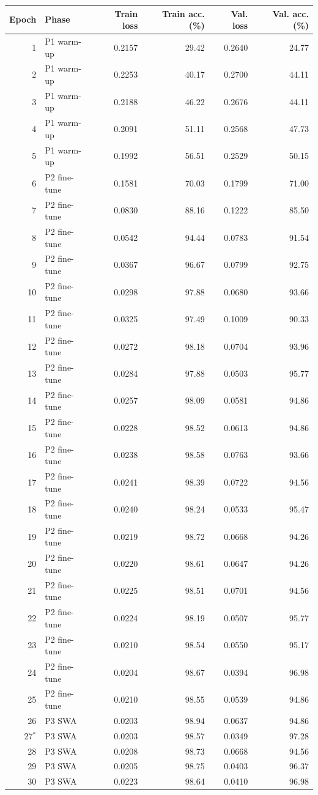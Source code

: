 \begin{tabular}{r l r r r r}
\toprule
\textbf{Epoch} & \textbf{Phase} & \textbf{Train loss} & \textbf{Train acc. (\%)} & \textbf{Val. loss} & \textbf{Val. acc. (\%)} \\
\midrule
1 & P1 warm-up & 0.2157 & 29.42 & 0.2640 & 24.77 \\
2 & P1 warm-up & 0.2253 & 40.17 & 0.2700 & 44.11 \\
3 & P1 warm-up & 0.2188 & 46.22 & 0.2676 & 44.11 \\
4 & P1 warm-up & 0.2091 & 51.11 & 0.2568 & 47.73 \\
5 & P1 warm-up & 0.1992 & 56.51 & 0.2529 & 50.15 \\
6 & P2 fine-tune & 0.1581 & 70.03 & 0.1799 & 71.00 \\
7 & P2 fine-tune & 0.0830 & 88.16 & 0.1222 & 85.50 \\
8 & P2 fine-tune & 0.0542 & 94.44 & 0.0783 & 91.54 \\
9 & P2 fine-tune & 0.0367 & 96.67 & 0.0799 & 92.75 \\
10 & P2 fine-tune & 0.0298 & 97.88 & 0.0680 & 93.66 \\
11 & P2 fine-tune & 0.0325 & 97.49 & 0.1009 & 90.33 \\
12 & P2 fine-tune & 0.0272 & 98.18 & 0.0704 & 93.96 \\
13 & P2 fine-tune & 0.0284 & 97.88 & 0.0503 & 95.77 \\
14 & P2 fine-tune & 0.0257 & 98.09 & 0.0581 & 94.86 \\
15 & P2 fine-tune & 0.0228 & 98.52 & 0.0613 & 94.86 \\
16 & P2 fine-tune & 0.0238 & 98.58 & 0.0763 & 93.66 \\
17 & P2 fine-tune & 0.0241 & 98.39 & 0.0722 & 94.56 \\
18 & P2 fine-tune & 0.0240 & 98.24 & 0.0533 & 95.47 \\
19 & P2 fine-tune & 0.0219 & 98.72 & 0.0668 & 94.26 \\
20 & P2 fine-tune & 0.0220 & 98.61 & 0.0647 & 94.26 \\
21 & P2 fine-tune & 0.0225 & 98.51 & 0.0701 & 94.56 \\
22 & P2 fine-tune & 0.0224 & 98.19 & 0.0507 & 95.77 \\
23 & P2 fine-tune & 0.0210 & 98.54 & 0.0550 & 95.17 \\
24 & P2 fine-tune & 0.0204 & 98.67 & 0.0394 & 96.98 \\
25 & P2 fine-tune & 0.0210 & 98.55 & 0.0539 & 94.86 \\
26 & P3 SWA & 0.0203 & 98.94 & 0.0637 & 94.86 \\
27$^{\ast}$ & P3 SWA & 0.0203 & 98.57 & 0.0349 & 97.28 \\
28 & P3 SWA & 0.0208 & 98.73 & 0.0668 & 94.56 \\
29 & P3 SWA & 0.0205 & 98.75 & 0.0403 & 96.37 \\
30 & P3 SWA & 0.0223 & 98.64 & 0.0410 & 96.98 \\
\bottomrule
\end{tabular}
